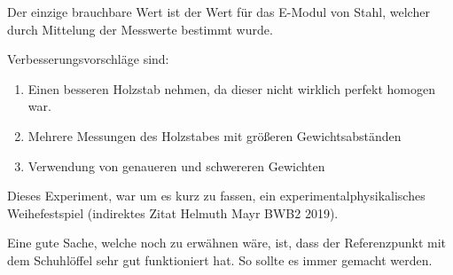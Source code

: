 \documentclass[11pt,ngerman]{scrartcl}
\begin{document}
Der einzige brauchbare Wert ist der Wert für das E-Modul von Stahl,
welcher durch Mittelung der Messwerte bestimmt wurde.

Verbesserungsvorschläge sind:

\begin{enumerate}
    \item Einen besseren Holzstab nehmen, da dieser nicht wirklich
        perfekt homogen war.
    \item Mehrere Messungen des Holzstabes mit größeren Gewichtsabständen
    \item Verwendung von genaueren und schwereren Gewichten
\end{enumerate}

Dieses Experiment, war um es kurz zu fassen, ein experimentalphysikalisches
Weihefestspiel (indirektes Zitat Helmuth Mayr BWB2 2019).

Eine gute Sache, welche noch zu erwähnen wäre, ist, dass der Referenzpunkt mit
dem Schuhlöffel sehr gut funktioniert hat. So sollte es immer gemacht werden.




\newpage
\printbibliography

\listoffigures

\listoftables
\end{document}
